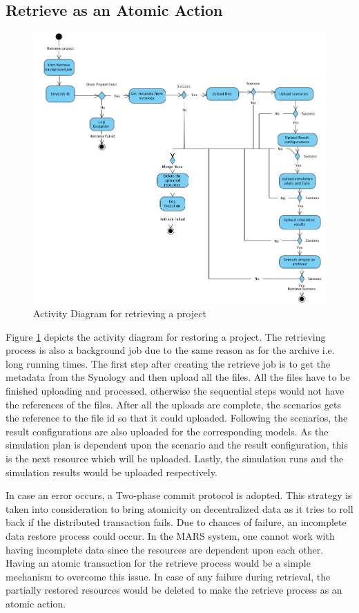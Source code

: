 \subsection{Retrieve as an Atomic Action}
\begin{figure}[H]
    \centering \includegraphics[scale=0.45]{grafiken/restoreActivity.png}
    \caption{Activity Diagram for retrieving a project}
    \label{fig:activityRestore}
\end{figure}

Figure \ref{fig:activityRestore} depicts the activity diagram for restoring a project. The retrieving process is also a background job due to the same reason
as for the archive i.e. long running times. The first step after creating the retrieve job is to get the metadata from the Synology and then upload all the files.
All the files have to be finished uploading and processed, otherwise the sequential steps would not have the references of the files. After all the uploads are complete,
the scenarios gets the reference to the file id so that it could uploaded. Following the scenarios, the result configurations are also uploaded for the corresponding models.
As the simulation plan is dependent upon the scenario and the result configuration, this is the next resource which will be uploaded. Lastly, the simulation runs
and the simulation results would be uploaded respectively. 

In case an error occurs, a Two-phase commit protocol \cite{atomic} is adopted. This strategy is taken into consideration to bring atomicity on decentralized data
as it tries to roll back if the distributed transaction fails.
Due to chances of failure, an incomplete data restore process could occur. In the MARS system, one cannot work with having
incomplete data since the resources are dependent upon each other. Having an atomic transaction for the retrieve process would be a simple mechanism to overcome
this issue. In case of any failure during retrieval, the partially restored resources would be deleted to make the retrieve process as an atomic action.

